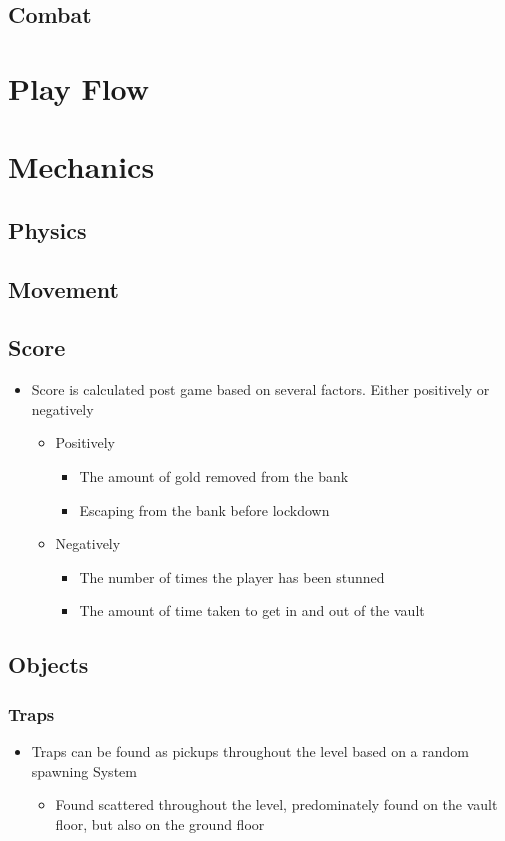 \documentclass[14pts]{report}
\begin{document}
\subsection{Combat}


\section{Play Flow}

\section{Mechanics}
\subsection{Physics}
\subsection{Movement}
\subsection{Score}
\begin{itemize}
    \item Score is calculated post game based on several factors. Either positively or negatively
    \begin{itemize}
        \item Positively
        \begin{itemize}
            \item The amount of gold removed from the bank
            \item Escaping from the bank before lockdown
        \end{itemize}
        \item Negatively
        \begin{itemize}
            \item The number of times the player has been stunned
            \item The amount of time taken to get in and out of the vault
        \end{itemize}
    \end{itemize}
\end{itemize}
\subsection{Objects}
\subsubsection{Traps}
\begin{itemize}
    \item Traps can be found as pickups throughout the level based on a random spawning System
    \begin{itemize}
        \item Found scattered throughout the level, predominately found on the vault floor, but also on the ground floor
    \end{itemize}
\end{itemize}
\end{document}
